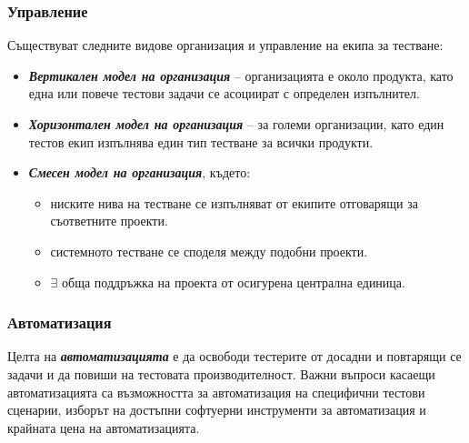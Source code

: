 \documentclass[fleqn,12pt]{article}
\begin{document}
\subsubsection{Управление}
Съществуват следните видове организация и управление на екипа за тестване:
\begin{itemize}
    \item \textbf{\textit{Вертикален модел на организация}} -- организацията е около продукта, като една или повече тестови задачи се асоциират с определен изпълнител.
    \item \textbf{\textit{Хоризонтален модел на организация}} -- за големи организации, като един тестов екип изпълнява един тип тестване за всички продукти.
    \item \textbf{\textit{Смесен модел на организация}}, където:
    \begin{itemize}
        \item ниските нива на тестване се изпълняват от екипите отговарящи за съответните проекти.
        \item системното тестване се споделя между подобни проекти.
        \item $\exists$ обща поддръжка на проекта от осигурена централна единица.
    \end{itemize}
\end{itemize}

\subsubsection{Автоматизация}

Целта на \textbf{\textit{автоматизацията}} е да освободи тестерите от досадни и повтарящи се задачи и да повиши на тестовата производителност.
Важни въпроси касаещи автоматизацията са възможността за автоматизация на специфични тестови сценарии, изборът на достъпни софтуерни инструменти за автоматизация и крайната цена на автоматизацията.
\end{document}
